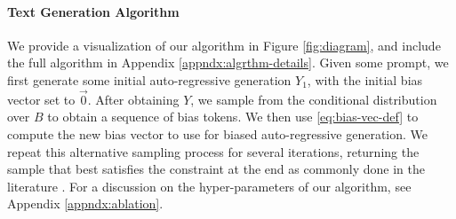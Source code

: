 \paragraph{Text Generation Algorithm} We provide a visualization of our algorithm in Figure \ref{fig:diagram}, and include the full algorithm in Appendix \ref{appndx:algrthm-details}. Given some prompt, we first generate some initial auto-regressive generation $Y_1$, with the initial bias vector set to $\Vec{0}$. After obtaining $Y$, we sample from the conditional distribution over $B$ to obtain a sequence of bias tokens. We then use \eqref{eq:bias-vec-def} to compute the new bias vector to use for biased auto-regressive generation. 
We repeat this alternative sampling process for several iterations, returning the sample that best satisfies the constraint at the end as commonly done in the literature \citep{kumar2022gradient,liu2023bolt}. 
For a discussion on the hyper-parameters of our algorithm, see Appendix \ref{appndx:ablation}. 